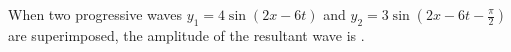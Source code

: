 
\item When two progressive waves $y_1 = 4 \sin(2x - 6t)$ and $y_2 = 3 \sin\left(2x - 6t - \frac{\pi}{2}\right)$ are superimposed, the amplitude of the resultant wave is \underline{\hspace{2.5cm}}.

\begin{center}
\end{center}
